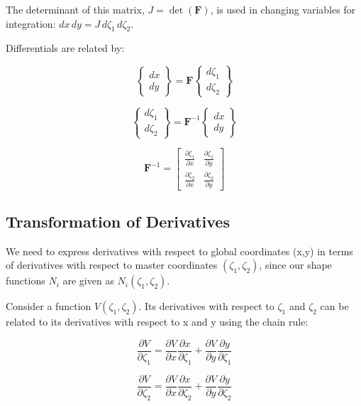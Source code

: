 \documentclass[
  11pt,
  a4paper,
]{scrbook}
\begin{document}
The determinant of this matrix, \(J = \det(\mathbf{F})\), is used in
changing variables for integration:
\(dx \, dy = J \, d\zeta_1 \, d\zeta_2\).

Differentials are related by:

\[\begin{Bmatrix} dx \\ dy \end{Bmatrix} = \mathbf{F} \begin{Bmatrix} d\zeta_1 \\ d\zeta_2 \end{Bmatrix}\]

\[\begin{Bmatrix} d\zeta_1 \\ d\zeta_2 \end{Bmatrix} = \mathbf{F}^{-1} \begin{Bmatrix} dx \\ dy \end{Bmatrix}\]

\[\mathbf{F}^{-1} = \begin{bmatrix} \frac{\partial \zeta_1}{\partial x} & \frac{\partial \zeta_1}{\partial y} \\ \frac{\partial \zeta_2}{\partial x} & \frac{\partial \zeta_2}{\partial y} \end{bmatrix}\]

\subsection{Transformation of
Derivatives}\label{transformation-of-derivatives}

We need to express derivatives with respect to global coordinates (x,y)
in terms of derivatives with respect to master coordinates
\((\zeta_1, \zeta_2)\), since our shape functions \(N_i\) are given as
\(N_i(\zeta_1, \zeta_2)\).

Consider a function \(V(\zeta_1, \zeta_2)\). Its derivatives with
respect to \(\zeta_1\) and \(\zeta_2\) can be related to its derivatives
with respect to x and y using the chain rule:

\[\frac{\partial V}{\partial \zeta_1} = \frac{\partial V}{\partial x} \frac{\partial x}{\partial \zeta_1} + \frac{\partial V}{\partial y} \frac{\partial y}{\partial \zeta_1}\]

\[\frac{\partial V}{\partial \zeta_2} = \frac{\partial V}{\partial x} \frac{\partial x}{\partial \zeta_2} + \frac{\partial V}{\partial y} \frac{\partial y}{\partial \zeta_2}\]
\end{document}
